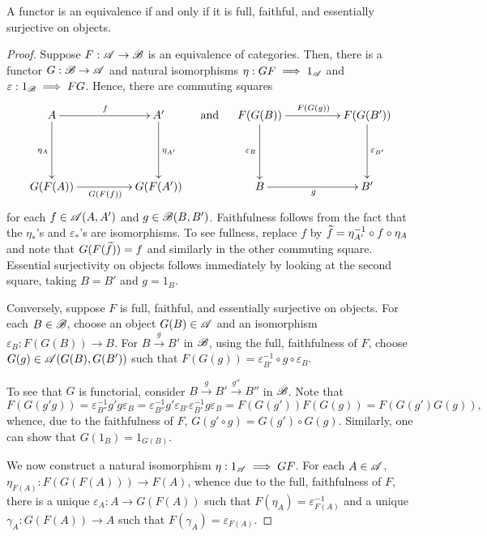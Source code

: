 \begin{theorem}
    A functor is an equivalence if and only if it is full, faithful, and essentially surjective on objects.
\end{theorem}
\begin{proof}
    Suppose $F:\mathscr A\to\mathscr B$ is an equivalence of categories. Then, there is a functor $G: \mathscr B\to\mathscr A$ and natural isomorphisms $\eta: GF\implies 1_{\mathscr A}$ and $\varepsilon: 1_{\mathscr B}\implies FG$. Hence, there are commuting squares 
    \begin{equation*}
        \xymatrix@+2pc {
            A\ar[r]^{f}\ar[d]_{\eta_A} & A'\ar[d]^{\eta_{A'}}\\
            G(F(A))\ar[r]_{G(F(f))} & G(F(A'))
        }
        \quad\text{ and }\quad
        \xymatrix@+2pc {
            F(G(B))\ar[r]^{F(G(g))}\ar[d]_{\varepsilon_B} & F(G(B'))\ar[d]^{\varepsilon_{B'}}\\
            B\ar[r]_{g} & B'
        }
    \end{equation*}
    for each $f\in\mathscr A(A, A')$ and $g\in\mathscr B(B, B')$. Faithfulness follows from the fact that the $\eta_{\ast}$'s and $\varepsilon_{\ast}$'s are isomorphisms. To see fullness, replace $f$ by $\widetilde{f} = \eta_{A'}^{-1}\circ f\circ\eta_A$ and note that $G(F(\widetilde{f})) = f$ and similarly in the other commuting square. Essential surjectivity on objects follows immediately by looking at the second square, taking $B = B'$ and $g = 1_{B}$.

    Conversely, suppose $F$ is full, faithful, and essentially surjective on objects. For each $B\in\mathscr B$, choose an object $G(B)\in\mathscr A$ and an isomorphism $\varepsilon_B: F(G(B))\to B$. For $B\xrightarrow{g} B'$ in $\mathscr B$, using the full, faithfulness of $F$, choose $G(g)\in\mathscr A(G(B), G(B'))$ such that $F(G(g)) = \varepsilon_{B'}^{-1}\circ g\circ\varepsilon_B$.

    To see that $G$ is functorial, consider $B\xrightarrow{g} B'\xrightarrow{g''} B''$ in $\mathscr B$. Note that 
    \begin{equation*}
        F(G(g' g)) = \varepsilon_{B''}^{-1}g'g\varepsilon_B = \varepsilon_{B''}^{-1}g'\varepsilon_{B'}\varepsilon_{B'}^{-1}g\varepsilon_B = F(G(g'))F(G(g)) = F(G(g')G(g)),
    \end{equation*}
    whence, due to the faithfulness of $F$, $G(g'\circ g) = G(g')\circ G(g)$. Similarly, one can show that $G(1_B) = 1_{G(B)}$.

    We now construct a natural isomorphism $\eta: 1_{\mathscr A}\implies GF$. For each $A\in\mathscr A$, $\eta_{F(A)}: F(G(F(A)))\to F(A)$, whence due to the full, faithfulness of $F$, there is a unique $\varepsilon_A: A\to G(F(A))$ such that $F(\eta_{A}) = \varepsilon_{F(A)}^{-1}$ and a unique $\gamma_A: G(F(A))\to A$ such that $F(\gamma_A) = \varepsilon_{F(A)}$. 
    

\end{proof}
